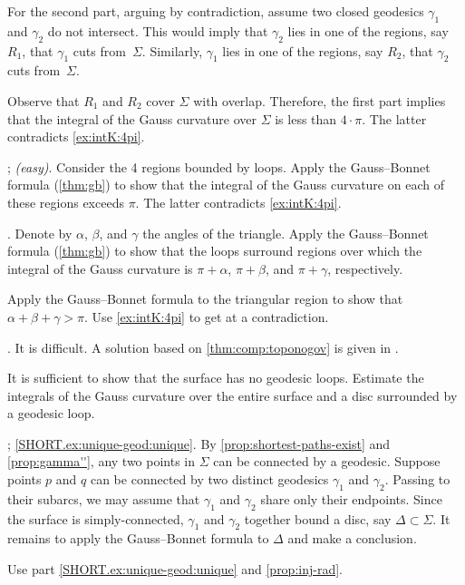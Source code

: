\begin{multicols}{2}
For the second part, arguing by contradiction, assume two closed geodesics $\gamma_1$ and $\gamma_2$ do not intersect. 
This would imply that $\gamma_2$ lies in one of the regions, say $R_1$, that $\gamma_1$ cuts from~$\Sigma$.
Similarly, $\gamma_1$ lies in one of the regions, say $R_2$, that $\gamma_2$ cuts from~$\Sigma$.

Observe that $R_1$ and $R_2$ cover $\Sigma$ with overlap.
Therefore, the first part implies that the integral of the Gauss curvature over $\Sigma$ is less than $4\cdot\pi$.
The latter contradicts \ref{ex:intK:4pi}.

\parbf{\ref{ex:self-intersections}}; \textit{(easy)}.
Consider the 4 regions bounded by loops.
Apply the Gauss--Bonnet formula (\ref{thm:gb}) to show that the integral of the Gauss curvature on each of these regions exceeds $\pi$.
The latter contradicts \ref{ex:intK:4pi}.

.
Denote by $\alpha$, $\beta$, and $\gamma$ the angles of the triangle.
Apply the Gauss--Bonnet formula (\ref{thm:gb}) to show that the loops surround regions over which the integral of the Gauss curvature is $\pi+\alpha$, $\pi+\beta$, and $\pi+\gamma$, respectively.

Apply the Gauss--Bonnet formula to the triangular region to show that $\alpha+\beta+\gamma>\pi$.
Use \ref{ex:intK:4pi} to get at a contradiction.


.
It is difficult.
A solution based on \ref{thm:comp:toponogov} is given in \cite{petrunin2021}.

It is sufficient to show that the surface has no geodesic loops.
Estimate the integrals of the Gauss curvature over the entire surface and a disc surrounded by a geodesic loop.

\parbf{\ref{ex:unique-geod}}; \ref{SHORT.ex:unique-geod:unique}.
By \ref{prop:shortest-paths-exist} and \ref{prop:gamma''}, any two points in $\Sigma$ can be connected by a geodesic.
Suppose points $p$ and $q$ can be connected by two distinct geodesics $\gamma_1$ and $\gamma_2$.
Passing to their subarcs, we may assume that $\gamma_1$ and $\gamma_2$ share only their endpoints.
Since the surface is simply-connected, $\gamma_1$ and $\gamma_2$ together bound a disc, say $\Delta\subset\Sigma$.
It remains to apply the Gauss--Bonnet formula to $\Delta$ and make a conclusion.
 
Use part \ref{SHORT.ex:unique-geod:unique} and \ref{prop:inj-rad}.


\end{multicols}
